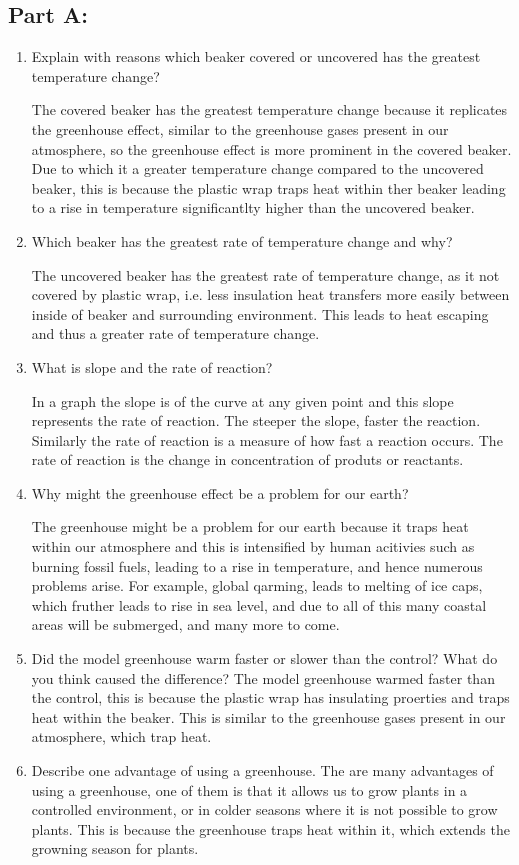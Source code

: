\documentclass[a4paper, 12pt, english]{article}
\begin{document}
\subsection{Part A:}

\begin{enumerate}
    \item Explain with reasons which beaker covered or uncovered has the greatest temperature change?
    
	The covered beaker has the greatest temperature change because it replicates the greenhouse effect, similar to 
	the greenhouse gases present in our atmosphere, so the greenhouse effect is more prominent in the covered beaker. Due 
	to which it a greater temperature change compared to the uncovered beaker, this is because the plastic wrap traps 
	heat within ther beaker leading to a rise in temperature significantlty higher than the uncovered beaker.
    \item Which beaker has the greatest rate of temperature change and why?
    
	The  uncovered beaker has the greatest rate of temperature change, as it not covered by plastic wrap, i.e. less insulation
	heat transfers more easily between inside of beaker and surrounding environment. This leads to heat escaping 
	and thus a greater rate of temperature change.
    \item What is slope and the rate of reaction?
    
    In a graph the slope is of the curve at any given point and this slope represents the rate
	of reaction. The steeper the slope, faster the reaction. Similarly the rate of reaction
	is a measure of how fast a reaction occurs. The rate of reaction is the change in concentration of produts or reactants.	
	\item Why might the greenhouse effect be a problem for our earth?
	
	The greenhouse might be a problem for our earth because it traps heat within our atmosphere and this is 
	intensified by human acitivies such as burning fossil fuels, leading to a rise in temperature, and 
	hence numerous problems arise. For example, global qarming, leads to melting of ice caps, which fruther leads to
	rise in sea level, and due to all of this many coastal areas will be submerged, and many more to come.
    \item Did the model greenhouse warm faster or slower than the control? What do you think caused the difference?
    The model greenhouse warmed faster than the control, this is because the plastic wrap has insulating proerties 
	and traps heat within the beaker. This is similar to the greenhouse gases present in our atmosphere, which trap heat.

	\item Describe one advantage of using a greenhouse.
	The are many advantages of using a greenhouse, one of them is that it allows us to grow plants in a controlled environment,
	or in colder seasons where it is not possible to grow plants. This is because the greenhouse traps heat within it, which
	extends the growning season for plants.
\end{enumerate}
\end{document}
